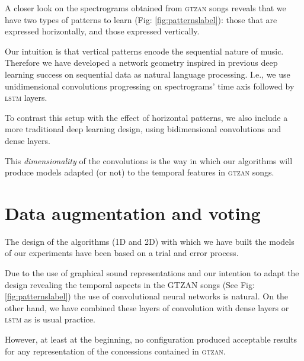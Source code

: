 A closer look on the spectrograms obtained from \textsc{gtzan} songs reveals that we have two types of patterns to learn (Fig: \ref{fig:patternslabel}): those that are expressed horizontally, and those expressed vertically.


Our intuition is that vertical patterns encode the sequential nature of music. Therefore we have developed a network geometry  inspired in previous deep learning success on sequential data as natural language processing. I.e., we use unidimensional convolutions progressing on spectrograms' time axis followed by \textsc{lstm} layers.


To contrast this setup with the effect of horizontal patterns, we also include a more traditional deep learning design, using bidimensional convolutions and dense layers.

This {\it dimensionality} of the convolutions is the way in which our algorithms will produce models adapted (or not) to the temporal features in \textsc{gtzan} songs.

\section{Data augmentation and voting}\label{sec:augmentation}

The design of the algorithms (1D and 2D) with which we have built the models of our experiments have been based on a trial and error process.

Due to the use of graphical sound representations and our intention to adapt the design revealing the temporal aspects in the GTZAN songs (See Fig: \ref{fig:patternslabel}) the use of convolutional neural networks is natural. On the other hand, we have combined these layers of convolution with dense layers or \textsc{lstm} as is usual practice.

However, at least at the beginning, no configuration produced acceptable results for any representation of the concessions contained in \textsc{gtzan}.

